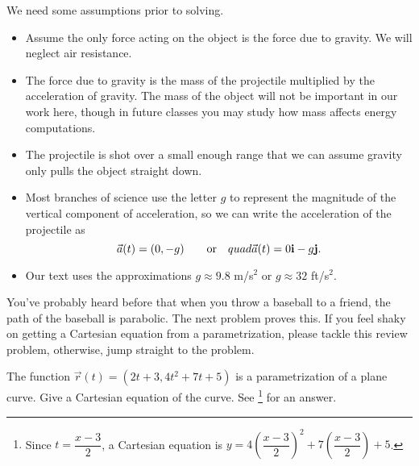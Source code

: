We need some assumptions prior to solving. 
\begin{itemize}
 \item Assume the only force acting on the object is the force due to gravity. We will neglect air resistance. 
 \item The force due to gravity is the mass of the projectile multiplied by the acceleration of gravity. The mass of the object will not be important in our work here, though in future classes you may study how mass affects energy computations. 
 \item The projectile is shot over a small enough range that we can assume gravity only pulls the object straight down.
 \item Most branches of science use the letter $g$ to represent the magnitude of the vertical component of acceleration, so we can write the acceleration of the projectile as 
$$\vec a(t) = (0,-g) \quad \quad \text{or}\quad quad \vec a(t)= 0{\bf i}-g{\bf j}.$$ 
 \item Our text uses the approximations $g\approx 9.8$ m/s$^2$ or $g\approx32$ ft/s$^2$. 
\end{itemize}


You've probably heard before that when you throw a baseball to a friend, the path of the baseball is parabolic. The next problem proves this. If you feel shaky on getting a Cartesian equation from a parametrization, please tackle this review problem, otherwise, jump straight to the problem.
\begin{review*}
 The function $\vec r(t) = (2t+3, 4t^2+7t+5)$ is a parametrization of a plane curve.  Give a Cartesian equation of the curve. 
 See \footnote{Since $t=\dfrac{x-3}{2}$, a Cartesian equation is $y = 4\left(\dfrac{x-3}{2}\right)^2+7\left(\dfrac{x-3}{2}\right)+5$. } for an answer.
\end{review*}


